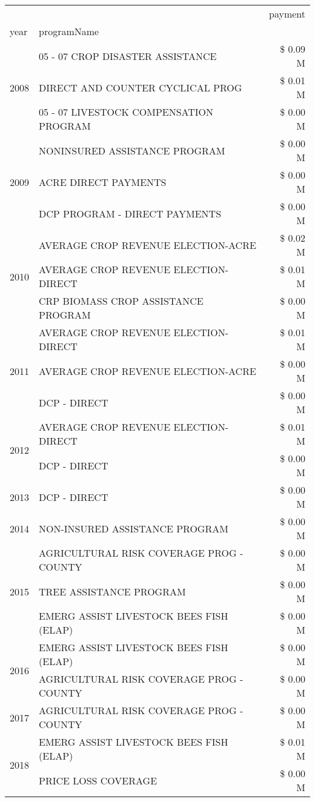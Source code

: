 \begin{tabular}{llr}
\toprule
 &  & payment \\
year & programName &  \\
\midrule
\multirow[t]{3}{*}{2008} & 05 - 07 CROP DISASTER ASSISTANCE & \$ 0.09 M \\
 & DIRECT AND COUNTER CYCLICAL PROG & \$ 0.01 M \\
 & 05 - 07 LIVESTOCK COMPENSATION PROGRAM & \$ 0.00 M \\
\cline{1-3}
\multirow[t]{3}{*}{2009} & NONINSURED ASSISTANCE PROGRAM & \$ 0.00 M \\
 & ACRE DIRECT PAYMENTS & \$ 0.00 M \\
 & DCP PROGRAM - DIRECT PAYMENTS & \$ 0.00 M \\
\cline{1-3}
\multirow[t]{3}{*}{2010} & AVERAGE CROP REVENUE ELECTION-ACRE & \$ 0.02 M \\
 & AVERAGE CROP REVENUE ELECTION-DIRECT & \$ 0.01 M \\
 & CRP BIOMASS CROP ASSISTANCE PROGRAM & \$ 0.00 M \\
\cline{1-3}
\multirow[t]{3}{*}{2011} & AVERAGE CROP REVENUE ELECTION-DIRECT & \$ 0.01 M \\
 & AVERAGE CROP REVENUE ELECTION-ACRE & \$ 0.00 M \\
 & DCP - DIRECT & \$ 0.00 M \\
\cline{1-3}
\multirow[t]{2}{*}{2012} & AVERAGE CROP REVENUE ELECTION-DIRECT & \$ 0.01 M \\
 & DCP - DIRECT & \$ 0.00 M \\
\cline{1-3}
2013 & DCP - DIRECT & \$ 0.00 M \\
\cline{1-3}
2014 & NON-INSURED ASSISTANCE PROGRAM & \$ 0.00 M \\
\cline{1-3}
\multirow[t]{3}{*}{2015} & AGRICULTURAL RISK COVERAGE PROG - COUNTY & \$ 0.00 M \\
 & TREE ASSISTANCE PROGRAM & \$ 0.00 M \\
 & EMERG ASSIST LIVESTOCK BEES FISH (ELAP) & \$ 0.00 M \\
\cline{1-3}
\multirow[t]{2}{*}{2016} & EMERG ASSIST LIVESTOCK BEES FISH (ELAP) & \$ 0.00 M \\
 & AGRICULTURAL RISK COVERAGE PROG - COUNTY & \$ 0.00 M \\
\cline{1-3}
2017 & AGRICULTURAL RISK COVERAGE PROG - COUNTY & \$ 0.00 M \\
\cline{1-3}
\multirow[t]{3}{*}{2018} & EMERG ASSIST LIVESTOCK BEES FISH (ELAP) & \$ 0.01 M \\
 & PRICE LOSS COVERAGE & \$ 0.00 M \\

\end{tabular}
